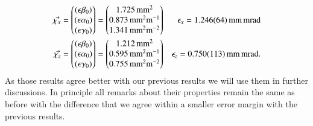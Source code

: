 \documentclass[11pt,a4paper,notitlepage]{scrartcl}
\begin{document}
\begin{align*}
	\vec{\chi_x}=\begin{pmatrix}
		(\epsilon\beta_0)\\
		(\epsilon\alpha_0)\\
		(\epsilon\gamma_0)\\
	\end{pmatrix}=\begin{pmatrix}
		\SI{1.725}{\milli\m^2}\\
		\SI{0.873}{\milli m^2m^{-1}}\\
		\SI{1.341}{\milli m^2m^{-2}}
	\end{pmatrix} && \epsilon_{x}=\SI{1.246\pm0.064}{\milli\m\milli\radian}\\
	\vec{\chi_z}=\begin{pmatrix}
		(\epsilon\beta_0)\\
		(\epsilon\alpha_0)\\
		(\epsilon\gamma_0)\\
	\end{pmatrix}=\begin{pmatrix}
		\SI{1.212}{\milli\m^2}\\
		\SI{0.595}{\milli m^2m^{-1}}\\
		\SI{0.755}{\milli m^2m^{-2}}
	\end{pmatrix} && \epsilon_{z}=\SI{0.750\pm0.113}{\milli\m\milli\radian}.
\end{align*}
As those results agree better with our previous results we will use them in further discussions. In principle all remarks about their properties remain the same as before with the difference that we agree within a smaller error margin with the previous results.
\end{document}
